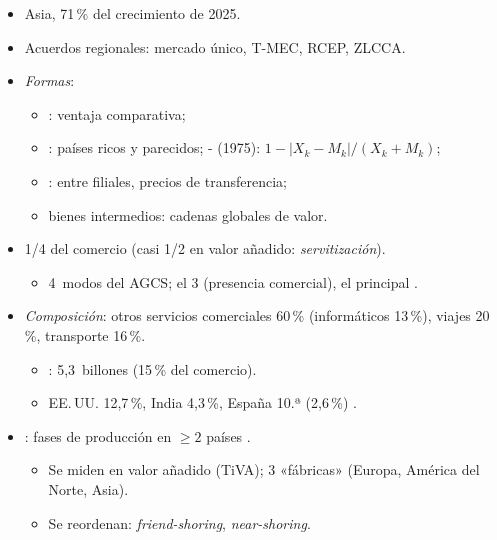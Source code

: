 \documentclass{article}
\begin{document}
\begin{columnas}
\begin{itemize}
\begin{itemize}
  \item Asia, 71\,\% del crecimiento de 2025.
  \item Acuerdos regionales: mercado único, T-MEC, RCEP, ZLCCA.
  \end{itemize}
\end{itemize}
\begin{itemize}
\item \emph{Formas}:
  \begin{itemize}
  \item {}: ventaja comparativa;
  \item {}: países ricos y parecidos; - (1975): $1-\lvert X_k-M_k\rvert/(X_k+M_k)$;
  \item {}: entre filiales, precios de transferencia;
  \item bienes intermedios: cadenas globales de valor.
  \end{itemize}
\end{itemize}

\begin{itemize}
\item 1/4 del comercio (casi 1/2 en valor añadido: \emph{servitización}).
  \begin{itemize}
  \item 4~modos del AGCS; el 3 (presencia comercial), el principal .
  \end{itemize}
\item \emph{Composición}: otros servicios comerciales 60\,\% (informáticos 13\,\%), viajes 20\,\%, transporte 16\,\%.
  \begin{itemize}
  \item {}: 5,3~billones (15\,\% del comercio).
  \item EE.\,UU. 12,7\,\%, India 4,3\,\%, España 10.ª (2,6\,\%) .
  \end{itemize}
\end{itemize}
\begin{itemize}
\item {}: fases de producción en $\geq 2$ países .
  \begin{itemize}
  \item Se miden en valor añadido (TiVA); 3 «fábricas» (Europa, América del Norte, Asia).
  \item Se reordenan: \emph{friend-shoring}, \emph{near-shoring}.
  \end{itemize}
\end{itemize}


\end{columnas}
\end{document}
